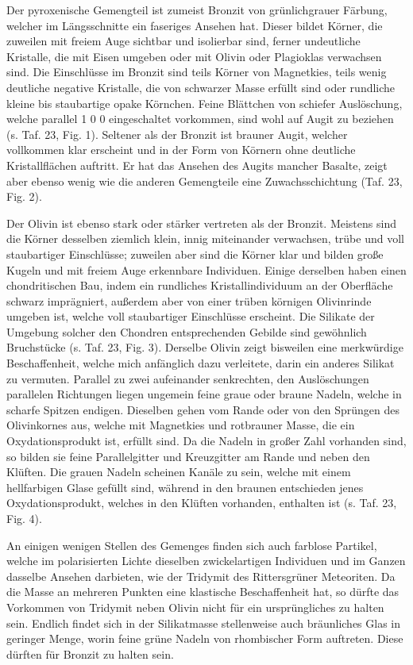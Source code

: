 \documentclass[a4paper, 11pt, oneside, polutonikogreek, german]{article}
\begin{document}
Der pyroxenische Gemengteil ist zumeist Bronzit von grünlichgrauer Färbung, welcher im Längsschnitte ein faseriges Ansehen hat. Dieser bildet Körner, die zuweilen mit freiem Auge sichtbar und isolierbar sind, ferner undeutliche Kristalle, die mit Eisen umgeben oder mit Olivin oder Plagioklas verwachsen sind. Die Einschlüsse im Bronzit sind teils Körner von Magnetkies, teils wenig deutliche negative Kristalle, die von schwarzer Masse erfüllt sind oder rundliche kleine bis staubartige opake Körnchen. Feine Blättchen von schiefer Auslöschung, welche parallel 1 0 0 eingeschaltet vorkommen, sind wohl auf Augit zu beziehen (s. Taf. 23, Fig. 1). Seltener als der Bronzit ist brauner Augit, welcher vollkommen klar erscheint und in der Form von Körnern ohne deutliche Kristallflächen auftritt. Er hat das Ansehen des Augits mancher Basalte, zeigt aber ebenso wenig wie die anderen Gemengteile eine Zuwachsschichtung (Taf. 23, Fig. 2).

Der Olivin ist ebenso stark oder stärker vertreten als der Bronzit. Meistens sind die Körner desselben ziemlich klein, innig miteinander verwachsen, trübe und voll staubartiger Einschlüsse; zuweilen aber sind die Körner klar und bilden große Kugeln und mit freiem Auge erkennbare Individuen. Einige derselben haben einen chondritischen Bau, indem ein rundliches Kristallindividuum an der Oberfläche schwarz imprägniert, außerdem aber von einer trüben körnigen Olivinrinde umgeben ist, welche voll staubartiger Einschlüsse erscheint. Die Silikate der Umgebung solcher den Chondren entsprechenden Gebilde sind gewöhnlich Bruchstücke (s. Taf. 23, Fig. 3). Derselbe Olivin zeigt bisweilen eine merkwürdige Beschaffenheit, welche mich anfänglich dazu verleitete, darin ein anderes Silikat zu vermuten. Parallel zu zwei aufeinander senkrechten, den Auslöschungen parallelen Richtungen liegen ungemein feine graue oder braune Nadeln, welche in scharfe Spitzen endigen. Dieselben gehen vom Rande oder von den Sprüngen des Olivinkornes aus, welche mit Magnetkies und rotbrauner Masse, die ein Oxydationsprodukt ist, erfüllt sind. Da die Nadeln in großer Zahl vorhanden sind, so bilden sie feine Parallelgitter und Kreuzgitter am Rande und neben den Klüften. Die grauen Nadeln scheinen Kanäle zu sein, welche mit einem hellfarbigen Glase gefüllt sind, während in den braunen entschieden jenes Oxydationsprodukt, welches in den Klüften vorhanden, enthalten ist (s. Taf. 23, Fig. 4).

An einigen wenigen Stellen des Gemenges finden sich auch farblose Partikel, welche im polarisierten Lichte dieselben zwickelartigen Individuen und im Ganzen dasselbe Ansehen darbieten, wie der Tridymit des Rittersgrüner Meteoriten. Da die Masse an mehreren Punkten eine klastische Beschaffenheit hat, so dürfte das Vorkommen von Tridymit neben Olivin nicht für ein ursprüngliches zu halten sein. Endlich findet sich in der Silikatmasse stellenweise auch bräunliches Glas in geringer Menge, worin feine grüne Nadeln von rhombischer Form auftreten. Diese dürften für Bronzit zu halten sein.
\end{document}
